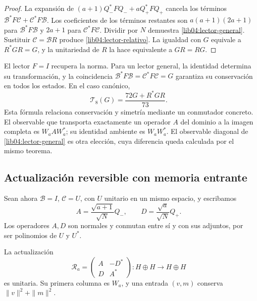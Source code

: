 \begin{proof}
La expansión de \((a+1)Q_-^*FQ_-+aQ_+^*FQ_+\) cancela los
términos \(\mathcal B^*F\mathcal C+\mathcal C^*F\mathcal B\).
Los coeficientes de los términos restantes son
\(a(a+1)(2a+1)\) para \(\mathcal B^*F\mathcal B\) y \(2a+1\)
para \(\mathcal C^*F\mathcal C\). Dividir por \(N\) demuestra
\eqref{lib04:lector-general}. Sustituir \(\mathcal C=\mathcal BR\)
produce \eqref{lib04:lector-relativo}. La igualdad con \(G\) equivale
a \(R^*GR=G\), y la unitariedad de \(R\) la hace equivalente a
\(GR=RG\).
\end{proof}

El lector \(F=I\) recupera la norma. Para un lector general, la
identidad determina su transformación, y la coincidencia
\(\mathcal B^*F\mathcal B=\mathcal C^*F\mathcal C=G\) garantiza
su conservación en todos los estados. En el caso canónico,
\begin{equation}
 \mathcal T_8(G)=\frac{72G+R^*GR}{73}.
 \label{lib04:lector-72}
\end{equation}
Esta fórmula relaciona conservación y simetría mediante un conmutador
concreto. El observable que transporta exactamente un operador
\(A\) del dominio a la imagen completa es \(W_aAW_a^*\); su
identidad ambiente es \(W_aW_a^*\). El observable diagonal de
\eqref{lib04:lector-general} es otra elección, cuya diferencia queda
calculada por el mismo teorema.

\subsection{Actualización reversible con memoria entrante}
\label{lib04:reentrada}

Sean ahora \(\mathcal B=I\), \(\mathcal C=U\), con \(U\)
unitario en un mismo espacio, y escribamos
\begin{equation}
 A=\frac{\sqrt{a+1}}{\sqrt N}Q_-,\qquad
 D=\frac{\sqrt a}{\sqrt N}Q_+.
 \label{lib04:ad}
\end{equation}
Los operadores \(A,D\) son normales y conmutan entre sí y con sus
adjuntos, por ser polinomios de \(U\) y \(U^*\).

\begin{theorem}
\label{lib04:teo-unitaria}
La actualización
\begin{equation}
 \mathscr R_a=
 \begin{pmatrix}A&-D^*\\D&A^*\end{pmatrix}:H\oplus H\to H\oplus H
 \label{lib04:unitaria}
\end{equation}
es unitaria. Su primera columna es \(W_a\), y una entrada
\((v,m)\) conserva \(\|v\|^2+\|m\|^2\).
\end{theorem}


